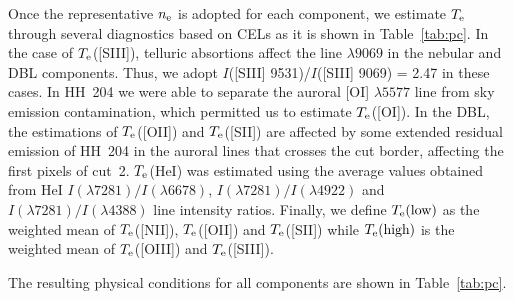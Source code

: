 \documentclass[twocolumn]{aastex63}
\begin{document}
Once the representative $n_{\rm e}$ is adopted for each component, we estimate $T_{\rm e}$ through several diagnostics based on CELs as it is shown in Table~\ref{tab:pc}. In the case of $T_{\rm e}$([S\thinspace III]), telluric absortions affect the line $\lambda 9069$ in the nebular and DBL components. Thus, we adopt $I$([S\thinspace III] 9531)/$I$([S\thinspace III] 9069) = 2.47 \citep{Podobedova09} in these cases. In HH~204 we were able to separate the auroral [O\thinspace I] $\lambda 5577$ line from sky emission contamination, which permitted us to estimate $T_{\rm e}$([O\thinspace I]). In the DBL, the estimations of $T_{\rm e}$([O\thinspace II]) and $T_{\rm e}$([S\thinspace II]) are affected by some extended residual emission of HH~204 in the auroral lines that crosses the cut border, affecting the first pixels of cut~2. $T_{\rm e}$(He\thinspace I) was estimated using the average values obtained from He\thinspace I  $I(\lambda7281)/I(\lambda6678 )$, $I(\lambda7281)/I(\lambda4922 )$ and $I(\lambda7281)/I(\lambda4388)$ line intensity ratios. Finally, we define $T_{\rm e} (\text{low})$ as the weighted mean of $T_{\rm e}$([N\thinspace II]), $T_{\rm e}$([O\thinspace II]) and $T_{\rm e}$([S\thinspace II]) while $T_{\rm e} (\text{high})$ is the weighted mean of $T_{\rm e}$([O\thinspace III]) and $T_{\rm e}$([S\thinspace III]).

The resulting physical conditions for all  components are shown in Table~\ref{tab:pc}.
\end{document}
